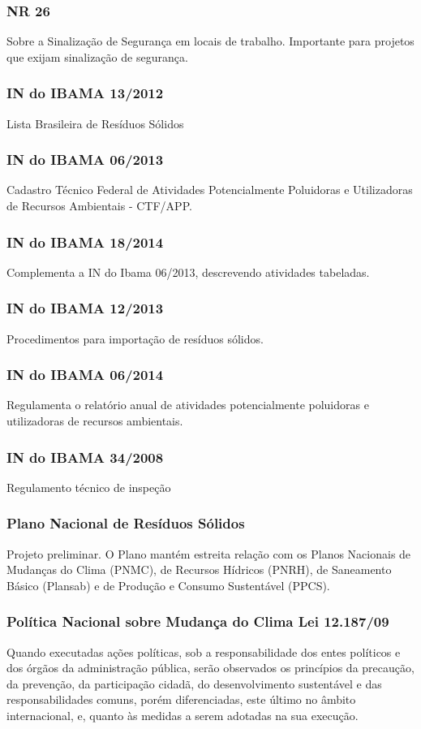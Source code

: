 \begin{subapend}
\begin{subsubapend}
		\subsubsection{NR 26}
		Sobre a Sinalização de Segurança em locais de trabalho. Importante para projetos que exijam sinalização de segurança.
		\subsubsection{IN do IBAMA 13/2012}
		Lista Brasileira de Resíduos Sólidos
		\subsubsection{IN do IBAMA 06/2013}
		Cadastro Técnico Federal de Atividades Potencialmente Poluidoras e Utilizadoras de Recursos Ambientais - CTF/APP.
		\subsubsection{IN do IBAMA 18/2014}
		Complementa a IN do Ibama 06/2013, descrevendo atividades tabeladas.
		\subsubsection{IN do IBAMA 12/2013}
		Procedimentos para importação de resíduos sólidos.
		\subsubsection{IN do IBAMA 06/2014}
		Regulamenta o relatório anual de atividades potencialmente poluidoras e utilizadoras de recursos ambientais.
		\subsubsection{IN do IBAMA 34/2008}
		Regulamento técnico de inspeção
		\subsubsection{Plano Nacional de Resíduos Sólidos}
		Projeto preliminar. O Plano mantém estreita relação com os Planos Nacionais de Mudanças do Clima (PNMC), de Recursos Hídricos (PNRH), de Saneamento Básico (Plansab) e de Produção e Consumo Sustentável (PPCS).
		\subsubsection{Política Nacional sobre Mudança do Clima Lei 12.187/09}
		Quando executadas ações políticas, sob a responsabilidade dos entes políticos e dos órgãos da administração pública, serão observados os princípios da precaução, da prevenção, da participação cidadã, do desenvolvimento sustentável e das responsabilidades comuns, porém diferenciadas, este último no âmbito internacional, e, quanto às medidas a serem adotadas na sua execução.

\end{subsubapend}
\end{subapend}
